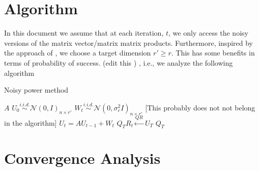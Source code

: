 \documentclass[10pt]{article}
\newcommand{\R}{\mathbb{R}}
\begin{document}
\section{Algorithm}
In this document we assume that at each iteration, $t$, we only access the noisy versions of the matrix vector/matrix matrix products. Furthermore, inspired by the approach of \cite{noisy_pm}, we choose a target dimension $r' \geq r$. This has some benefits in terms of probability of success. (edit this ) , i.e., we analyze the following algorithm 

\begin{algorithm}[H]
\caption{Noisy power method}\label{algo:rankr}
  \begin{algorithmic}[1]
    \REQUIRE $A$ 
    \STATE $U_0 \overset{i.i.d.}{\sim} \mathcal{N}(0, I)_{n \times r'}$ %
    \STATE $W_t \overset{i.i.d.}{\sim} \mathcal{N}(0, \sigma_c^2 I)_{n \times r'}$ [This probably does not not belong in the algorithm]
    \STATE $U_t = A U_{t-1} + W_t$ 
    \ENDFOR
    \STATE $Q_T R_t \overset{QR}{\leftarrow} U_T$
    \ENSURE $Q_T$ 
  \end{algorithmic}
\end{algorithm}


\newcommand{\Y}{\bm{Y}}
\newcommand{\z}{\bm{z}}




\newcommand{\E}{\mathbb{E}}
\newcommand{\ucos}{\bm{\alpha}}
\newcommand{\usin}{\bm{\alpha}_{\perp}}

\newcommand{\wcos}{\bm{\beta}}
\newcommand{\wsin}{{\bm{\beta}_{\perp}}}

\newcommand{\utcos}{\bm{\delta}}
\newcommand{\utsin}{{\bm{\delta}_{\perp}}}


\section{Convergence Analysis}
 
\end{document}
